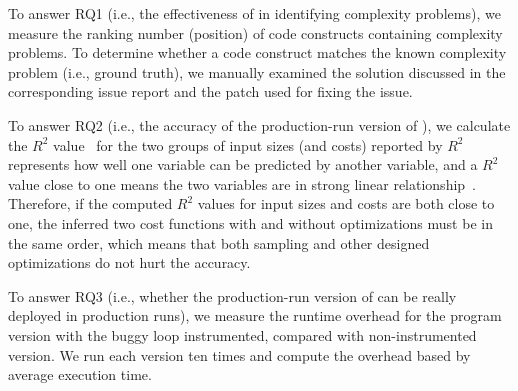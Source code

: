 To answer RQ1 (i.e., the effectiveness of  \Tool in identifying
complexity problems), we measure the ranking number (position) of code
constructs containing complexity problems. 
To determine whether a code construct matches
the known complexity problem (i.e., ground truth), 
we manually examined the solution discussed in the corresponding issue 
report and the patch used for fixing the issue. 

To answer RQ2 (i.e., the accuracy of the production-run version of \Tool),
we calculate the $R^2$ value~\cite{rsquare} 
for the two groups of input sizes (and costs) reported by 
$R^2$ represents how well one variable can be predicted by another variable,
and a $R^2$ value close to one means the two variables are 
in strong linear relationship~\cite{rsquare-value}.
Therefore, if the computed $R^2$ values for input sizes and costs
are both close to one,
the inferred two cost functions with and without optimizations must be in the same order, 
which means that both sampling and other designed optimizations 
do not hurt the accuracy. 

To answer RQ3 (i.e., whether the production-run version of \Tool 
can be really deployed in production runs), 
we measure the runtime overhead for the program version 
with the buggy loop instrumented, compared with non-instrumented version. 
We run each version ten times and compute the overhead based by average execution time. 



